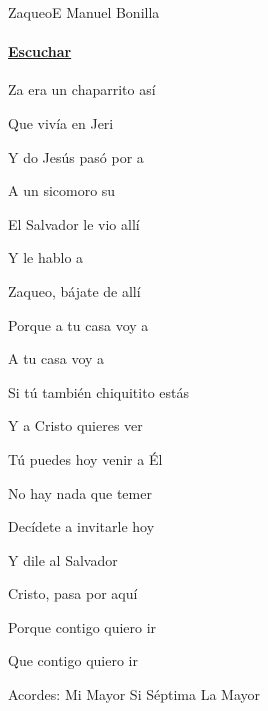 \documentclass[12pt, spanish]{book}
\newcommand{\NotCCLIed}{\relax}
\begin{document}
    \begin{song}{Zaqueo}{E}
    {} %
    {Manuel Bonilla}
    {} %
    {} %
        \ifChordBk
        \paragraph{\mbox{}\hfill\protect\href{https://open.spotify.com/intl-es/track/08vuoQqGMlE0HLEe1GG8ui}{Escuchar}\mbox{}\hfill}
        \fi


        \begin{SBOpGroup}
            Za era un chaparrito así

            Que vivía en Jeri

            Y do Jesús pasó por a

            A un sicomoro su
        \end{SBOpGroup}

        \begin{SBChorus}
            El Salvador le vio allí

            Y le hablo a

            Zaqueo, bájate de allí

            Porque a tu casa voy a 

            A tu casa voy a 
        \end{SBChorus}

        \begin{SBOpGroup}
            Si tú también chiquitito estás

            Y a Cristo quieres ver

            Tú puedes hoy venir a Él

            No hay nada que temer
        \end{SBOpGroup}

        \begin{SBOpGroup}
            Decídete a invitarle hoy

            Y dile al Salvador

            Cristo, pasa por aquí

            Porque contigo quiero ir

            Que contigo quiero ir
        \end{SBOpGroup}

        \ifChordBk
        \begin{SBOpGroup}
            Acordes:
            \upchord{\E}\qquad Mi Mayor \hfill
            \upchord{\Bseven}\qquad Si S\'eptima \hfill\null\break
            \upchord{\A}\qquad La Mayor \hfill\null\break
        \end{SBOpGroup}
        \fi
    \end{song}

    \ifChordBk
        
        \theendnotes
        
        
        
    \fi

    
\end{document}
